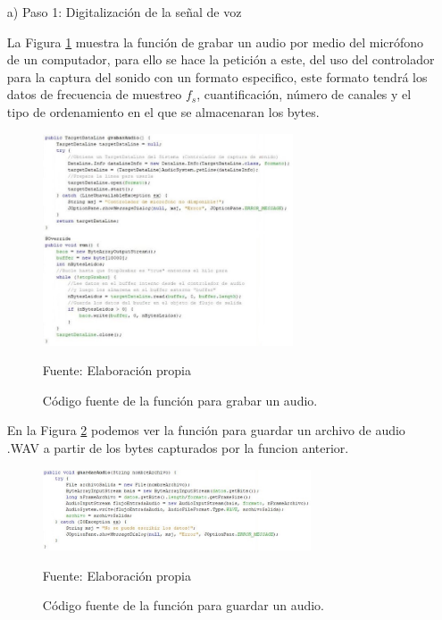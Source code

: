 \begin{enumerate}
\item[a)]Paso 1: Digitalización de la señal de voz
\par
La Figura \ref{fig:figura3.4} muestra la función de grabar un audio por medio del micrófono de un computador, para ello se hace la petición a este, del uso del controlador para la captura del sonido con un formato especifico, este formato tendrá los datos de frecuencia de muestreo $f_{s}$, cuantificación, número de canales y el tipo de ordenamiento en el que se almacenaran los bytes.
\begin{figure}[H]
\captionsetup{justification=centering}
\begin{center}
\includegraphics[width=0.7\textwidth]{Imagenes/Cap3/image004}
\end{center}
\begin{center}
\vskip -0.5cm
\caption{\small{Código fuente de la función para grabar un audio.}}
\label{fig:figura3.4}
{\small{Fuente: Elaboración propia}}
\end{center}
\end{figure}

En la Figura \ref{fig:figura3.5} podemos ver la función para guardar un archivo de audio .WAV a partir de los bytes capturados por la funcion anterior.
\begin{figure}[H]
\captionsetup{justification=centering}
\begin{center}
\includegraphics[width=0.75\textwidth]{Imagenes/Cap3/image005}
\end{center}
\begin{center}
\vskip -0.5cm
\caption{\small{Código fuente de la función para guardar un audio.}}
\label{fig:figura3.5}
{\small{Fuente: Elaboración propia}}
\end{center}
\end{figure}


\end{enumerate}
